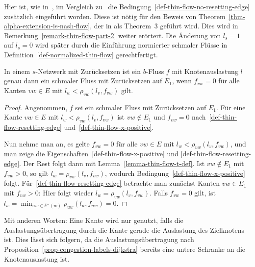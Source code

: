 \begin{remark}\label{remark-thin-flow}
	Hier ist, wie in~\cite[Definition~4]{Cominetti2011}, im Vergleich zu~\cite[Definition~6]{Koch2011} die Bedingung~\ref{def-thin-flow-no-resetting-edge} zusätzlich eingeführt worden.
	Diese ist nötig für den Beweis von Theorem~\ref{thm-alpha-extension-is-nash-flow}, der in \cite{Koch2011} als Theorem~3 geführt wird.
	Dies wird in Bemerkung~\ref{remark-thin-flow-part-2} weiter erörtert.
	Die Änderung von $l_s=1$ auf $l_s=0$ wird später durch die Einführung normierter schmaler Flüsse in Definition~\ref{def-normalized-thin-flow} gerechtfertigt.
\end{remark}

\begin{lemma}\label{lemma-equivalent-thin-flow}
	In einem $s$-Netzwerk mit Zurücksetzen ist ein $b$-Fluss $f$ mit Knotenauslastung $l$ genau dann ein schmaler Fluss mit Zurück\-setzen auf $E_1$, wenn $f_{vw}= 0$ für alle Kanten $vw\in E$ mit $l_w < \rho_{vw}(l_v, f_{vw})$ gilt.
\end{lemma}
\begin{proof}
	Angenommen, $f$ sei ein schmaler Fluss mit Zurücksetzen auf $E_1$.
	Für eine Kante $vw\in E$ mit $l_w < \rho_{vw}(l_v, f_{vw})$ ist $vw\notin E_1$ und $f_{vw}=0$ nach~\ref{def-thin-flow-resetting-edge} und~\ref{def-thin-flow-x-positive}.

	Nun nehme man an, es gelte $f_{vw}=0$ für alle $vw\in E$ mit $l_w < \rho_{vw}(l_v, f_{vw})$, und man zeige die Eigenschaften~\ref{def-thin-flow-x-positive} und \ref{def-thin-flow-resetting-edge}.
	Der Rest folgt dann mit Lemma~\ref{lemma-thin-flow-t-def}.
	Ist $vw\notin E_1$ mit $f_{vw}>0$, so gilt $l_w = \rho_{vw}(l_v, f_{vw})$, wodurch Bedingung~\ref{def-thin-flow-x-positive} folgt.
	Für~\ref{def-thin-flow-resetting-edge} betrachte man zunächst Kanten $vw\in E_1$ mit $f_{vw}>0$:
	Hier folgt wieder $l_w = \rho_{vw}(l_v, f_{vw})$.
	Falls $f_{vw}=0$ gilt, ist $l_w=\min_{uw\in \delta^-(w)} \rho_{uw}(l_u, f_{uw}) = 0$.
\end{proof}

Mit anderen Worten: Eine Kante wird nur genutzt, falls die Auslastungs\-über\-tra\-gung durch die Kante gerade die Auslastung des Zielknotens ist.
Dies lässt sich folgern, da die Auslastungsübertragung nach Proposition~\ref{prop-congestion-labels-dijkstra} bereits eine untere Schranke an die Knotenauslastung ist.

